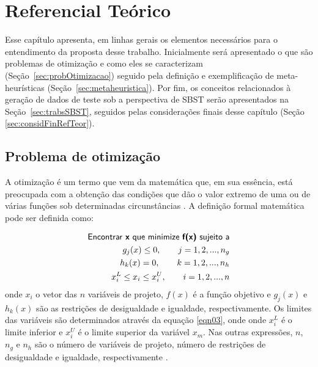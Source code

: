 \chapter[Referencial Teórico]{Referencial Teórico} \label{referencialteorico} 
Esse capítulo apresenta, em linhas gerais os elementos necessários para o entendimento da proposta desse trabalho. Inicialmente será apresentado o que são problemas de otimização e como eles se caracterizam (Seção~\ref{sec:probOtimizacao}) seguido pela definição e exemplificação de meta-heurísticas (Seção~\ref{sec:metaheuristica}). Por fim, os conceitos relacionados à geração de dados de teste sob a perspectiva de SBST serão apresentados na Seção~\ref{sec:trabsSBST}, seguidos pelas considerações finais desse capítulo (Seção \ref{sec:considFinRefTeor}).  


\section{Problema de otimização \label{sec:probOtimizacao}}

A otimização é um termo que vem da matemática que, em sua essência, está
preocupada com a obtenção das condições que dão o valor extremo de uma ou de
várias funções sob determinadas circunstâncias \cite{snyman2005practical}. A definição formal
matemática pode ser definida como: 

\begin{eqnarray}
\label{eqn01}
	 \textsf{Encontrar \textbf{x} que minimize \textbf{f(x)} sujeito a} \nonumber \\
     g_j(x) \leq 0, \qquad j = 1, 2, ..., n_g \\
\label{eqn02}
      h_k(x) = 0, \qquad k = 1, 2, ..., n_h \\
\label{eqn03}
      x_{i}^{L} \leq x_i \leq x_{i}^{U}, \qquad i = 1, 2, ..., n 
\end{eqnarray}
onde $x_{i}$ o vetor das $n$ variáveis de projeto, $f(x)$ é a função objetivo e $g_{j}(x)$ e $h_{k}(x)$ são as restrições de desigualdade e igualdade, respectivamente. Os limites das variáveis são determinados através da equação \ref{eqn03}, onde onde $x_{i}^{L}$ é o limite inferior e $x_{i}^{U}$ é o limite superior da variável $x_{m}$. Nas outras expressões, $n$, $n_{g}$ e $n_{h}$ são o número de variáveis de projeto, número de restrições de desigualdade e igualdade, respectivamente \cite{gandomi2013metaheuristic}.  

